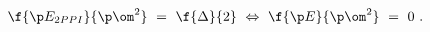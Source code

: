 \begin{equation}\label{16}
\f{\p E_{2PPI}}{\p \om^{2}} ~=~ \f{\Delta}{2} ~\Leftrightarrow~
\f{\p E}{\p \om^{2}} ~=~ 0 ~.
\end{equation}

